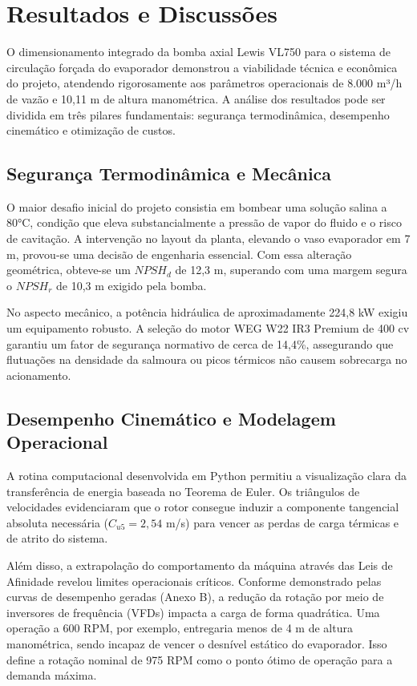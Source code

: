 \chapter{Resultados e Discussões}
\label{ch:resultados}
O dimensionamento integrado da bomba axial Lewis VL750 para o sistema de circulação forçada do evaporador demonstrou a viabilidade técnica e econômica do projeto, atendendo rigorosamente aos parâmetros operacionais de 8.000 m³/h de vazão e 10,11 m de altura manométrica. A análise dos resultados pode ser dividida em três pilares fundamentais: segurança termodinâmica, desempenho cinemático e otimização de custos.

\section{Segurança Termodinâmica e Mecânica}
\label{sec:seguranca}
O maior desafio inicial do projeto consistia em bombear uma solução salina a 80°C, condição que eleva substancialmente a pressão de vapor do fluido e o risco de cavitação. A intervenção no layout da planta, elevando o vaso evaporador em 7 m, provou-se uma decisão de engenharia essencial. Com essa alteração geométrica, obteve-se um $NPSH_d$ de 12,3 m, superando com uma margem segura o $NPSH_r$ de 10,3 m exigido pela bomba.

No aspecto mecânico, a potência hidráulica de aproximadamente 224,8 kW exigiu um equipamento robusto. A seleção do motor WEG W22 IR3 Premium de 400 cv garantiu um fator de segurança normativo de cerca de 14,4\%, assegurando que flutuações na densidade da salmoura ou picos térmicos não causem sobrecarga no acionamento.

\section{Desempenho Cinemático e Modelagem Operacional}
\label{sec:desempenho}
A rotina computacional desenvolvida em Python permitiu a visualização clara da transferência de energia baseada no Teorema de Euler. Os triângulos de velocidades evidenciaram que o rotor consegue induzir a componente tangencial absoluta necessária ($C_{u5} = 2,54$ m/s) para vencer as perdas de carga térmicas e de atrito do sistema.

Além disso, a extrapolação do comportamento da máquina através das Leis de Afinidade revelou limites operacionais críticos. Conforme demonstrado pelas curvas de desempenho geradas (Anexo B), a redução da rotação por meio de inversores de frequência (VFDs) impacta a carga de forma quadrática. Uma operação a 600 RPM, por exemplo, entregaria menos de 4 m de altura manométrica, sendo incapaz de vencer o desnível estático do evaporador. Isso define a rotação nominal de 975 RPM como o ponto ótimo de operação para a demanda máxima.

